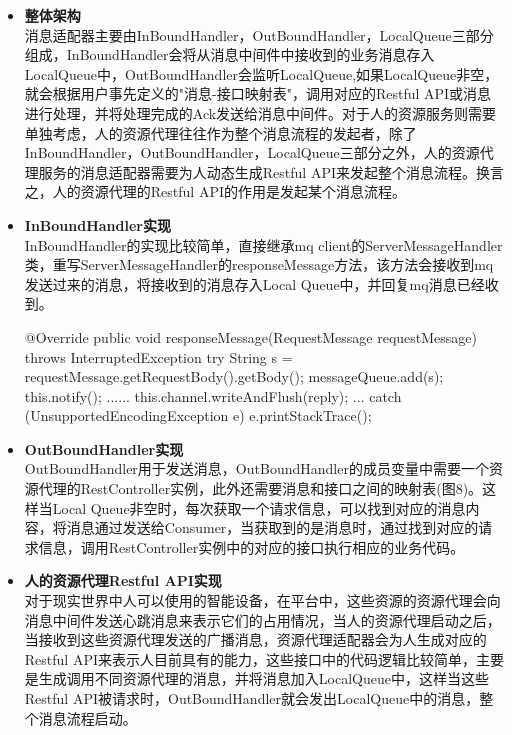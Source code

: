 \documentclass[a4paper]{article}
\theoremstyle{definition}
\begin{document}
\begin{itemize}
    \item {\textbf{整体架构}}\\
    消息适配器主要由InBoundHandler，OutBoundHandler，LocalQueue三部分组成，InBoundHandler会将从消息中间件中接收到的业务消息存入LocalQueue中，OutBoundHandler会监听LocalQueue,如果LocalQueue非空，就会根据用户事先定义的"消息-接口映射表"，调用对应的Restful API或消息进行处理，并将处理完成的Ack发送给消息中间件。对于人的资源服务则需要单独考虑，人的资源代理往往作为整个消息流程的发起者，除了InBoundHandler，OutBoundHandler，LocalQueue三部分之外，人的资源代理服务的消息适配器需要为人动态生成Restful API来发起整个消息流程。换言之，人的资源代理的Restful API的作用是发起某个消息流程。 
    \item {\textbf{InBoundHandler实现}}\\
    InBoundHandler的实现比较简单，直接继承mq
    client的ServerMessageHandler类，重写ServerMessageHandler的responseMessage方法，该方法会接收到mq发送过来的消息，将接收到的消息存入Local Queue中，并回复mq消息已经收到。
    \begin{scala}
   @Override
    public void responseMessage(RequestMessage requestMessage) throws InterruptedException {
        try {
            String s = requestMessage.getRequestBody().getBody();
            messageQueue.add(s);
            this.notify();
            ......
            this.channel.writeAndFlush(reply);
            ...
        } catch (UnsupportedEncodingException e) {
            e.printStackTrace();
        }
    }
\end{scala}

    \item {\textbf{OutBoundHandler实现}}\\
    OutBoundHandler用于发送消息，OutBoundHandler的成员变量中需要一个资源代理的RestController实例，此外还需要消息和接口之间的映射表(图8)。这样当Local Queue非空时，每次获取一个请求信息，可以找到对应的消息内容，将消息通过发送给Consumer，当获取到的是消息时，通过找到对应的请求信息，调用RestController实例中的对应的接口执行相应的业务代码。
    
    \item{\textbf{人的资源代理Restful API实现}}\\
    对于现实世界中人可以使用的智能设备，在平台中，这些资源的资源代理会向消息中间件发送心跳消息来表示它们的占用情况，当人的资源代理启动之后，当接收到这些资源代理发送的广播消息，资源代理适配器会为人生成对应的Restful API来表示人目前具有的能力，这些接口中的代码逻辑比较简单，主要是生成调用不同资源代理的消息，并将消息加入LocalQueue中，这样当这些Restful API被请求时，OutBoundHandler就会发出LocalQueue中的消息，整个消息流程启动。
\end{itemize}
\end{document}
